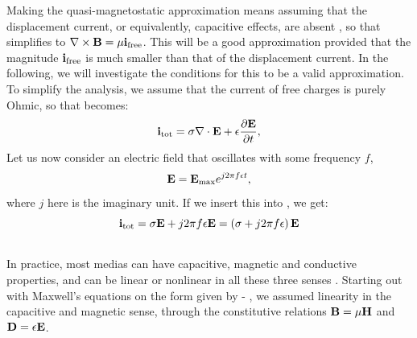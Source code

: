 Making the quasi-magnetostatic approximation means assuming that the displacement current, or equivalently, capacitive effects, are absent , so that  simplifies to ${\bf \nabla} \times {\bf B}  =  \mu{\bf i}_\text{free}$. This will be a good approximation provided that the magnitude ${\bf i}_\text{free}$ is much smaller  than that of the displacement current. In the following, we will investigate the conditions for this to be a valid approximation. To simplify the analysis, we assume that the current of free charges is purely Ohmic, so that  becomes:
\begin{equation}
{\bf i}_\text{tot} = \sigma {\bf \nabla} \cdot {\bf E} + \epsilon\frac{\partial {\bf E}}{\partial t},
\label{eq:Basics:totcurrent2}
\end{equation}
Let us now consider an electric field that oscillates with some frequency $f$,
\begin{equation}
{\bf E} = {\bf E}_\text{max} e^{j2\pi f \epsilon t},
\label{eq:Basics:Ecomponent}
\end{equation}
where $j$ here is the imaginary unit. 
If we insert this into , we get:
\begin{equation}
{\bf i}_\text{tot} = \sigma{\bf E} +  j 2 \pi f \epsilon {\bf E} = \left( \sigma + j 2 \pi f \epsilon \right){\bf E}
\label{eq:Basics:totcurrent3}
\end{equation}

\subsection{ }
\label{sec:Basics:LinEx}
In practice, most medias can  have capacitive, magnetic and conductive properties, and can be linear or nonlinear in all these three senses . Starting out with Maxwell's equations on the form given by - , we assumed linearity in the capacitive and magnetic sense, through the constitutive relations ${\bf B} = \mu{\bf H}$ and ${\bf D} = \epsilon {\bf E}$.













